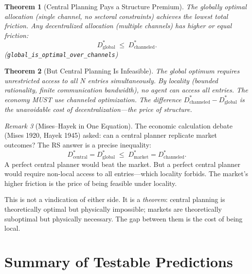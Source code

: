 \documentclass[11pt,a4paper]{article}
\theoremstyle{plain}
\newtheorem{theorem}{Theorem}[section]
\theoremstyle{definition}
\theoremstyle{remark}
\newtheorem{remark}[theorem]{Remark}
\begin{document}
\begin{theorem}[Central Planning Pays a Structure Premium]
The globally optimal allocation (single channel, no sectoral constraints) achieves the lowest total friction.
Any decentralized allocation (multiple channels) has higher or equal friction:
\[
D^*_{\text{global}} \;\le\; D^*_{\text{channeled}}.
\]
\emph{(\texttt{global\_is\_optimal\_over\_channels})}
\end{theorem}

\begin{theorem}[But Central Planning Is Infeasible]
The global optimum requires unrestricted access to all $N$ entries simultaneously.
By locality (bounded rationality, finite communication bandwidth), no agent can access all entries.
The economy MUST use channeled optimization.
The difference $D^*_{\text{channeled}} - D^*_{\text{global}}$ is the unavoidable cost of decentralization---the price of structure.
\end{theorem}

\begin{remark}[Mises--Hayek in One Equation]
The economic calculation debate (Mises 1920, Hayek 1945) asked: can a central planner replicate market outcomes?
The RS answer is a precise inequality:
\[
D^*_{\text{central}} = D^*_{\text{global}} \;\le\; D^*_{\text{market}} = D^*_{\text{channeled}}.
\]
A perfect central planner would beat the market.
But a perfect central planner would require non-local access to all entries---which locality forbids.
The market's higher friction is the price of being feasible under locality.

This is not a vindication of either side.
It is a \emph{theorem}: central planning is theoretically optimal but physically impossible; markets are theoretically suboptimal but physically necessary.
The gap between them is the cost of being local.
\end{remark}

\section{Summary of Testable Predictions}\label{sec:summary}
\end{document}

